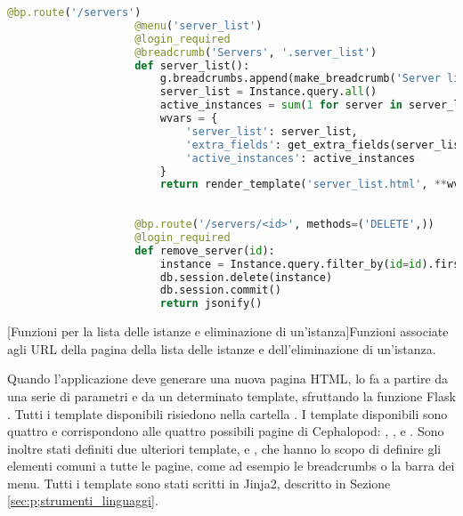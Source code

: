             \begin{center}
                \begin{lstlisting}[language=python, gobble=18]
                    @bp.route('/servers')
                    @menu('server_list')
                    @login_required
                    @breadcrumb('Servers', '.server_list')
                    def server_list():
                        g.breadcrumbs.append(make_breadcrumb('Server list'))
                        server_list = Instance.query.all()
                        active_instances = sum(1 for server in server_list if server.enabled)
                        wvars = {
                            'server_list': server_list,
                            'extra_fields': get_extra_fields(server_list),
                            'active_instances': active_instances
                        }
                        return render_template('server_list.html', **wvars)
                    
                    
                    @bp.route('/servers/<id>', methods=('DELETE',))
                    @login_required
                    def remove_server(id):
                        instance = Instance.query.filter_by(id=id).first()
                        db.session.delete(instance)
                        db.session.commit()
                        return jsonify()
                \end{lstlisting}
                \captionsetup{textformat=empty,labelformat=empty} \vspace{-2em}
                [Funzioni per la lista delle istanze e eliminazione di un'istanza]{Funzioni associate agli URL della pagina della lista delle istanze e dell'eliminazione di un'istanza.}
            \end{center}
            
            Quando l'applicazione deve generare una nuova pagina \ac{HTML}, lo fa a partire da una serie di parametri e da un determinato template, sfruttando la funzione Flask . Tutti i template disponibili risiedono nella cartella . I template disponibili sono quattro e corrispondono alle quattro possibili pagine di Cephalopod: , ,  e . Sono inoltre stati definiti due ulteriori template,  e , che hanno lo scopo di definire gli elementi comuni a tutte le pagine, come ad esempio le breadcrumbs o la barra dei menu. Tutti i template sono stati scritti in Jinja2, descritto in Sezione \ref{sec:p;strumenti_linguaggi}.
            
